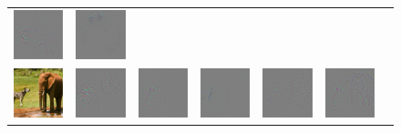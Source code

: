 \begin{figure}
\begin{center}
\begin{tabular}{ccccccc}
\includegraphics[width=0.14\linewidth,height=0.11\linewidth]{figs/examples/googlenet/deconv/bic-car2_diff_672} &
\includegraphics[width=0.14\linewidth,height=0.11\linewidth]{figs/examples/googlenet/soft/bic-car2_diff_672} \\
\vspace{-2.5pt}
\includegraphics[width=0.14\linewidth,height=0.11\linewidth]{figs/examples/googlenet/oxford/zeb-ele1} &
\includegraphics[width=0.14\linewidth,height=0.11\linewidth]{figs/examples/googlenet/oxford/zeb-ele1_diff_341} &
\includegraphics[width=0.14\linewidth,height=0.11\linewidth]{figs/examples/googlenet/deconv/zeb-ele1_diff_341} &
\includegraphics[width=0.14\linewidth,height=0.11\linewidth]{figs/examples/googlenet/soft/zeb-ele1_diff_341} &
\includegraphics[width=0.14\linewidth,height=0.11\linewidth]{figs/examples/googlenet/oxford/zeb-ele1_diff_387} &
\includegraphics[width=0.14\linewidth,height=0.11\linewidth]{figs/examples/googlenet/deconv/zeb-ele1_diff_387} &

\end{tabular}
\end{center}
\end{figure}

